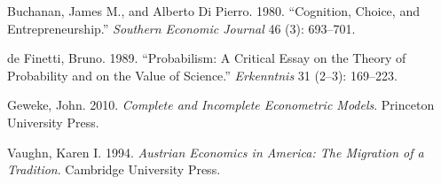 \documentclass[
  letterpaper,
  DIV=11,
  numbers=noendperiod]{scrartcl}
\newlength{\cslhangindent}
\newenvironment{CSLReferences}[2] %
 {\begin{list}{}{%
  \setlength{\itemindent}{0pt}
  \setlength{\leftmargin}{0pt}
  \setlength{\parsep}{0pt}
  \ifodd #1
   \setlength{\leftmargin}{\cslhangindent}
   \setlength{\itemindent}{-1\cslhangindent}
  \fi
  \setlength{\itemsep}{#2\baselineskip}}}
 {\end{list}}
\begin{document}
\label{refs}
\begin{CSLReferences}{1}{0}
Buchanan, James M., and Alberto Di Pierro. 1980. {``{Cognition, Choice,
and Entrepreneurship}.''} \emph{{Southern Economic Journal}} 46 (3):
693--701.

de Finetti, Bruno. 1989. {``{Probabilism}: {A Critical Essay on the
Theory of Probability and on the Value of Science}.''}
\emph{{Erkenntnis}} {31} ({2--3}): 169--223.

Geweke, John. 2010. \emph{{Complete and Incomplete Econometric Models}}.
{Princeton University Press}.

Vaughn, Karen I. 1994. \emph{{Austrian Economics in America}: {The
Migration of a Tradition}}. {Cambridge University Press}.

\end{CSLReferences}
\end{document}
